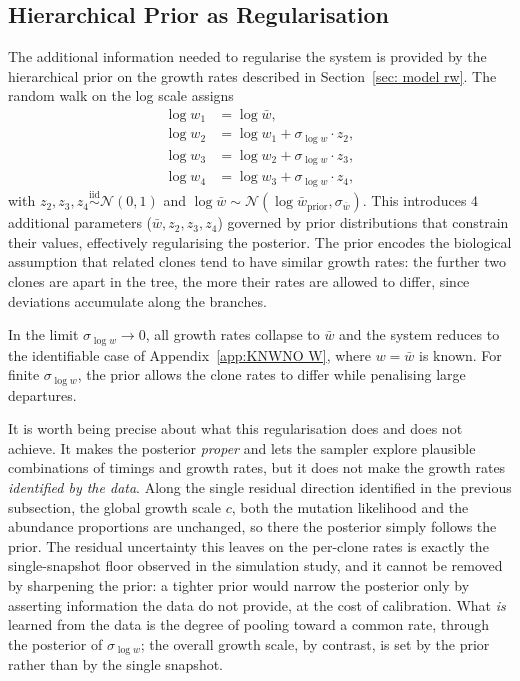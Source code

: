 \subsection*{Hierarchical Prior as Regularisation}

The additional information needed to regularise the system is provided by the 
hierarchical prior on the growth rates described in Section~\ref{sec: model rw}. 
The random walk on the log scale assigns
%
\begin{align}
    \log w_1 &= \log \bar{w}, \\[4pt]
    \log w_2 &= \log w_1 + \sigma_{\log w} \cdot z_2, \\[4pt]
    \log w_3 &= \log w_2 + \sigma_{\log w} \cdot z_3, \\[4pt]
    \log w_4 &= \log w_3 + \sigma_{\log w} \cdot z_4,
\end{align}
%
with $z_2, z_3, z_4 \overset{\mathrm{iid}}{\sim} \mathcal{N}(0,1)$ and 
$\log \bar{w} \sim \mathcal{N}(\log \bar{w}_{\mathrm{prior}}, \sigma_{\bar{w}})$. 
This introduces $4$ additional parameters ($\bar{w}, z_2, z_3, z_4$) governed 
by prior distributions that constrain their values, effectively regularising the 
posterior. The prior encodes the biological assumption that related clones tend 
to have similar growth rates: the further two clones are apart in the tree, the 
more their rates are allowed to differ, since deviations accumulate along the 
branches.

In the limit $\sigma_{\log w} \to 0$, all growth rates collapse to $\bar{w}$ and
the system reduces to the identifiable case of Appendix~\ref{app:KNWNO W}, where
$w = \bar{w}$ is known. For finite $\sigma_{\log w}$, the prior allows the clone
rates to differ while penalising large departures.

It is worth being precise about what this regularisation does and does not achieve.
It makes the posterior \emph{proper} and lets the sampler explore plausible
combinations of timings and growth rates, but it does not make the growth rates
\emph{identified by the data}. Along the single residual direction identified in the
previous subsection, the global growth scale $c$, both the mutation likelihood and the
abundance proportions are unchanged, so there the posterior simply follows the prior.
The residual uncertainty this leaves on the
per-clone rates is exactly the single-snapshot floor observed in the simulation
study, and it cannot be removed by sharpening the prior: a tighter prior would narrow
the posterior only by asserting information the data do not provide, at the cost of
calibration. What \emph{is} learned from the data is the degree of pooling toward a
common rate, through the posterior of $\sigma_{\log w}$; the overall growth scale, by
contrast, is set by the prior rather than by the single snapshot.